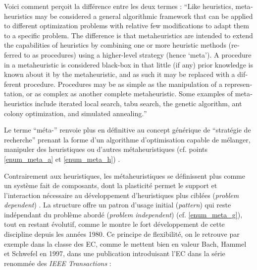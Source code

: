 Voici comment \textcite[8]{Brownlee2012} perçoit la différence entre les deux termes : \foreignquote{english}{Like heuristics, metaheuristics may be considered a general algorithmic framework that can be applied to different optimization problems with relative few modifications to adapt them to a specific problem. The difference is that metaheuristics are intended to extend the capabilities of heuristics by combining one or more heuristic methods (referred to as procedures) using a higher-level strategy (hence ‘meta’). A procedure in a metaheuristic is considered black-box in that little (if any) prior knowledge is known about it by the metaheuristic, and as such it may be replaced with a different procedure. Procedures may be as simple as the manipulation of a representation, or as complex as another complete metaheuristic. Some examples of metaheuristics include iterated local search, tabu search, the genetic algorithm, ant colony optimization, and simulated annealing.}

Le terme \enquote{méta-} renvoie plus en définitive au concept générique de \enquote{stratégie de recherche} prenant la forme d'un algorithme d'optimisation capable de mélanger, manipuler des heuristiques ou d'autres métaheuristiques (cf. points \ref{enum_meta_a} et \ref{enum_meta_h}) .

Contrairement aux heuristiques, les métaheuristiques se définissent plus comme un système fait de composants, dont la plasticité permet le support et l'interaction nécessaire au développement d'heuristiques plus ciblées (\textit{problem dependent}) . La structure offre un patron d'usage initial (\textit{pattern}) qui reste indépendant du problème abordé (\textit{problem independent}) (cf. \ref{enum_meta_g}), tout en restant évolutif, comme le montre le fort développement de cette discipline depuis les années 1980. Ce principe de flexibilité, on le retrouve par exemple dans la classe des EC, comme le mettent bien en valeur Bach, Hammel et Schwefel en 1997, dans une publication introduisant l'EC dans la série renommée des \textit{IEEE Transactions} :

